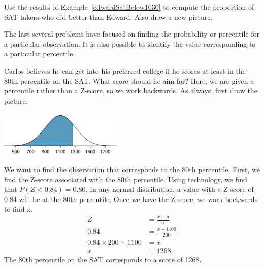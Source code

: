 \begin{exercisewrap}
\begin{nexercise}
Use the results of Example~\ref{edwardSatBelow1030} to compute the proportion of SAT takers who did better than Edward. Also draw a new picture.\footnotemark
\end{nexercise}
\end{exercisewrap}



The last several problems have focused on finding the probability or percentile for a particular observation. It is also possible to identify the value corresponding to a particular percentile.

\B{\newpage}

\begin{examplewrap}
\begin{nexample}{Carlos believes he can get into his preferred college if he scores at least in the 80th percentile on the SAT. What score should he aim for?}
Here, we are given a percentile rather than a Z-score, so we work backwards. As always, first draw the picture.
\begin{center}
\includegraphics[height=22mm]{ch_distributions/figures/sat80thPercentile/sat80thPercentile}
\end{center}
We want to find the observation that corresponds to the 80th percentile. First, we find the Z-score associated with the 80th percentile. Using technology, we find that $P(Z < 0.84) = 0.80$. In any normal distribution, a value with a Z-score of 0.84 will be at the 80th percentile. Once we have the Z-score, we work backwards to find x.
\begin{align*}
Z &= \frac{x-\mu}{\sigma} \\
0.84 &= \frac{x-1100}{200} \\
0.84 \times 200+1100 &= x \\
x& = 1268
\end{align*}
The 80th percentile on the SAT corresponds to a score of 1268.
\end{nexample}
\end{examplewrap}

